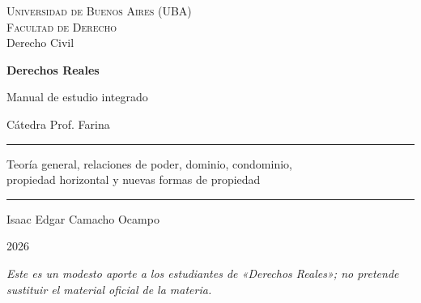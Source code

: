 \documentclass[12pt,oneside]{book}
\newcommand{\universidad}{Universidad de Buenos Aires (UBA)}
\newcommand{\facultad}{Facultad de Derecho}
\newcommand{\carrera}{Derecho Civil}
\newcommand{\materia}{Derechos Reales}
\newcommand{\subtitulo}{Manual de estudio integrado}
\newcommand{\catedra}{Cátedra Prof. Farina}
\newcommand{\autor}{Isaac Edgar Camacho Ocampo}
\newcommand{\anio}{2026}
\begin{document}
\frontmatter

\begin{titlepage}
\thispagestyle{empty}
\begin{center}
\vspace*{1cm}
{\large \textsc{\universidad}}\\[0.2cm]
{\large \textsc{\facultad}}\\[0.2cm]
{\large \carrera}

\vspace{3cm}

{\Huge \textbf{\materia}}

\vspace{1cm}

{\LARGE \subtitulo}

\vspace{0.4cm}

{\normalsize \catedra}

\vspace{1.2cm}

\rule{0.70\textwidth}{0.5pt}

\vspace{0.4cm}

{\large Teoría general, relaciones de poder, dominio, condominio,\\ propiedad horizontal y nuevas formas de propiedad}

\vspace{0.4cm}

\rule{0.70\textwidth}{0.5pt}

\vfill

{\large \autor}

\vspace{0.3cm}

{\large \anio}
\end{center}

\vfill

\begin{flushleft}
\small\textit{Este es un modesto aporte a los estudiantes de «Derechos Reales»; no pretende sustituir el material oficial de la materia.}
\end{flushleft}
\end{titlepage}

\tableofcontents
\end{document}
